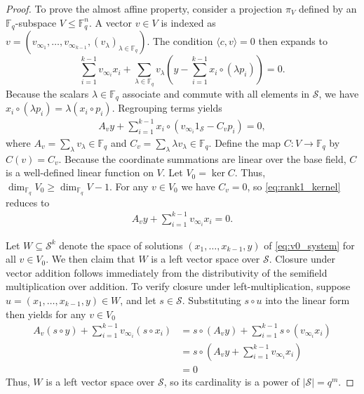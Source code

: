 \documentclass[a4paper,11pt,reqno]{article}
\newcommand{\F}{\mathbb{F}}
\renewcommand{\S}{\mathcal{S}}
\theoremstyle{plain} \numberwithin{equation}{section}
\theoremstyle{definition}
\begin{document}
\begin{proof}
To prove the almost affine property, consider a projection $\pi_V$ defined by an $\F_q$-subspace $V\leq \F_{q}^n$. A vector $v\in V$ is indexed as $v= (v_{\infty_1},\ldots,v_{\infty_{k-1}},(v_\lambda)_{\lambda \in \F_q})$. The condition $\langle c,v\rangle =0$ then expands to
\[
    \sum^{k-1}_{i=1} v_{\infty_i} x_i + \sum_{\lambda \in \F_q} v_\lambda \left(y - \sum^{k-1}_{i=1} x_i \circ (\lambda p_i)\right) =0.
\]
Because the scalars $\lambda \in \F_q$ associate and commute with all elements in $\S$, we have $x_i \circ (\lambda p_i) = \lambda (x_i \circ p_i)$. Regrouping terms yields
\begin{align}
    A_v y + \sum^{k-1}_{i=1} x_i \circ (v_{\infty_i} 1_\S - C_v p_i) = 0, \label{eq:rank1_kernel}
\end{align}
where $A_v = \sum_\lambda v_\lambda \in \F_q$ and $C_v = \sum_\lambda \lambda v_\lambda \in \F_q$. Define the map $C\colon V\rightarrow \F_q$ by $C(v) = C_v$. Because the coordinate summations are linear over the base field, $C$ is a well-defined linear function on $V$. Let $V_0 = \ker C$. Thus, $\dim_{\F_q} V_0 \geq \dim_{\F_q} V -1$. For any $v\in V_0$ we have $C_v =0$, so \eqref{eq:rank1_kernel} reduces to
\begin{align} \label{eq:v0_system}
    A_v y + \sum^{k-1}_{i=1} v_{\infty_i} x_i=0.
\end{align}

Let $W\subseteq \S^k$ denote the space of solutions $(x_1,\ldots,x_{k-1},y)$ of \eqref{eq:v0_system} for all $v\in V_0$. We then claim that $W$ is a left vector space over $\S$. Closure under vector addition follows immediately from the distributivity of the semifield multiplication over addition. To verify closure under left-multiplication, suppose $u=(x_1,\ldots,x_{k-1},y)\in W$, and let $s\in \S$. Substituting $s\circ u$ into the linear form then yields for any $v\in V_0$
\begin{align*}
    A_v(s\circ y) + \sum^{k-1}_{i=1}v_{\infty_i} (s\circ x_i) &= s\circ (A_v y) + \sum^{k-1}_{i=1} s\circ (v_{\infty_i} x_i) \\
    &= s\circ \left( A_v y + \sum^{k-1}_{i=1} v_{\infty_i} x_i\right) \\ &=0
\end{align*}
Thus, $W$ is a left vector space over $\S$, so its cardinality is a power of $|\S|=q^m$. 


\end{proof}
\end{document}
